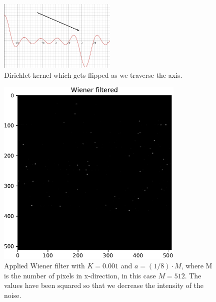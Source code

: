 {    \begin{figure}[H]
        {\centering
            \includegraphics[width=0.5\textwidth]{sincprob.png}
            \caption{Dirichlet kernel which gets flipped as we traverse the axis.}
            \label{sinccprob}
        \par}
        \end{figure}


\begin{figure}[H]
    {\centering
        \includegraphics[width=0.8\textwidth]{carttopol_trans_back2.pdf}
        \caption{Applied Wiener filter with $K = 0.001$ and $a = (1/8)\cdot M$, where M is the number of pixels in x-direction, in this case $M = 512$. The values have been squared so that we decrease the intensity of the noise.}
        \label{changingsystem2}
    \par}
    \end{figure}
    
}
